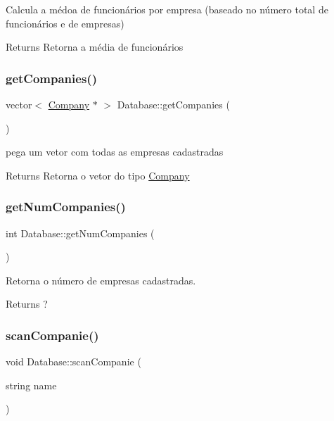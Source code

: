 Calcula a médoa de funcionários por empresa (baseado no número total de funcionários e de empresas) 

\begin{DoxyReturn}{Returns}
Retorna a média de funcionários 
\end{DoxyReturn}
\mbox{\label{classDatabase_a318aca3d5d8984e4cc0783260a18daf3}} 
\subsubsection{\texorpdfstring{get\+Companies()}{getCompanies()}}
{\footnotesize\ttfamily vector$<$ \hyperlink{classCompany}{Company} $\ast$ $>$ Database\+::get\+Companies (\begin{DoxyParamCaption}{ }\end{DoxyParamCaption})}



pega um vetor com todas as empresas cadastradas 

\begin{DoxyReturn}{Returns}
Retorna o vetor do tipo \hyperlink{classCompany}{Company} 
\end{DoxyReturn}
\mbox{\label{classDatabase_a33c998e4231049e3b5496bbcd030e432}} 
\subsubsection{\texorpdfstring{get\+Num\+Companies()}{getNumCompanies()}}
{\footnotesize\ttfamily int Database\+::get\+Num\+Companies (\begin{DoxyParamCaption}{ }\end{DoxyParamCaption})}



Retorna o número de empresas cadastradas. 

\begin{DoxyReturn}{Returns}
? 
\end{DoxyReturn}
\mbox{\label{classDatabase_a9a331222c95bac4d20bcd33c5f9e6ded}} 
\subsubsection{\texorpdfstring{scan\+Companie()}{scanCompanie()}}
{\footnotesize\ttfamily void Database\+::scan\+Companie (\begin{DoxyParamCaption}\item[{string}]{name }\end{DoxyParamCaption})}



